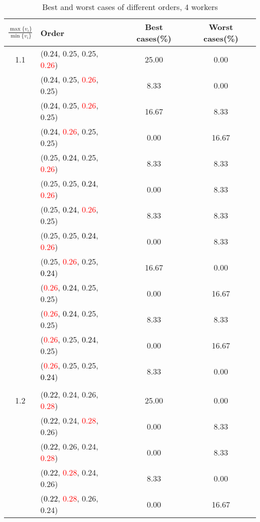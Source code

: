 \documentclass[10pt,a4paper]{report}
\begin{document}
\newpage\begin{center}
	\small
	\begin{longtable}{clcc}
		\caption{Best and worst cases of different orders, 4 workers}\\
		\toprule
		\setlength{\tabcolsep}{1mm}
		\renewcommand\baselinestretch{0.5}\selectfont
		$\frac{\max\{v_i\}}{\min\{v_i\}}$ & Order & Best cases(\%) & Worst cases(\%) \\
			\midrule		1.1			&(\textcolor{black}{0.24}, 0.25, 0.25, \textcolor{red}{0.26})&25.00&0.00\\
			&(\textcolor{black}{0.24}, 0.25, \textcolor{red}{0.26}, 0.25)&8.33&0.00\\
			&(\textcolor{black}{0.24}, 0.25, \textcolor{red}{0.26}, 0.25)&16.67&8.33\\
			&(\textcolor{black}{0.24}, \textcolor{red}{0.26}, 0.25, 0.25)&0.00&16.67\\
			&(0.25, \textcolor{black}{0.24}, 0.25, \textcolor{red}{0.26})&8.33&8.33\\
			&(0.25, 0.25, \textcolor{black}{0.24}, \textcolor{red}{0.26})&0.00&8.33\\
			&(0.25, \textcolor{black}{0.24}, \textcolor{red}{0.26}, 0.25)&8.33&8.33\\
			&(0.25, 0.25, \textcolor{black}{0.24}, \textcolor{red}{0.26})&0.00&8.33\\
			&(0.25, \textcolor{red}{0.26}, 0.25, \textcolor{black}{0.24})&16.67&0.00\\
			&(\textcolor{red}{0.26}, \textcolor{black}{0.24}, 0.25, 0.25)&0.00&16.67\\
			&(\textcolor{red}{0.26}, \textcolor{black}{0.24}, 0.25, 0.25)&8.33&8.33\\
			&(\textcolor{red}{0.26}, 0.25, \textcolor{black}{0.24}, 0.25)&0.00&16.67\\
			&(\textcolor{red}{0.26}, 0.25, 0.25, \textcolor{black}{0.24})&8.33&0.00\\
		&&&\\
		1.2			&(\textcolor{black}{0.22}, 0.24, 0.26, \textcolor{red}{0.28})&25.00&0.00\\
			&(\textcolor{black}{0.22}, 0.24, \textcolor{red}{0.28}, 0.26)&0.00&8.33\\
			&(\textcolor{black}{0.22}, 0.26, 0.24, \textcolor{red}{0.28})&0.00&8.33\\
			&(\textcolor{black}{0.22}, \textcolor{red}{0.28}, 0.24, 0.26)&8.33&0.00\\
			&(\textcolor{black}{0.22}, \textcolor{red}{0.28}, 0.26, 0.24)&0.00&16.67\\

\end{longtable}
\end{center}
\end{document}
